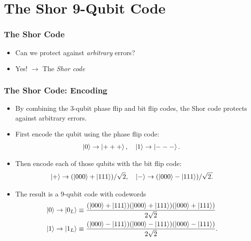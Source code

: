 \documentclass{beamer}
\begin{document}
\section{The Shor 9-Qubit Code}
\begin{frame}
    \frametitle{The Shor Code}
    \begin{itemize}
        \item<1-> Can we protect against \textit{arbitrary} errors?
        \item<2-> Yes! $\longrightarrow$ The \textit{Shor code}
    \end{itemize}
\end{frame}

\begin{frame}
    \frametitle{The Shor Code: Encoding}
    \begin{itemize}
        \item<1-> By combining the 3-qubit phase flip and bit flip codes, the Shor code protects against arbitrary errors.
        \item<2-> First encode the qubit using the phase flip code: $$\left\vert{0}\right\rangle\rightarrow\left\vert{+++}\right\rangle,\quad \left\vert{1}\right\rangle\rightarrow\left\vert{---}\right\rangle.$$
        \item<3-> Then encode each of those qubits with the bit flip code: $$\left\vert{+}\right\rangle\rightarrow (\left\vert{000}\right\rangle+\left\vert{111}\right\rangle)/\sqrt{2},\quad \left\vert{-}\right\rangle\rightarrow (\left\vert{000}\right\rangle-\left\vert{111}\right\rangle)/\sqrt{2.}$$
        \item<4-> The result is a 9-qubit code with codewords 
        \begin{align*}
            & \left\vert{0}\right\rangle \rightarrow \left\vert{0_L}\right\rangle \equiv \frac{(\left\vert{000}\right\rangle + \left\vert{111}\right\rangle)(\left\vert{000}\right\rangle + \left\vert{111}\right\rangle)(\left\vert{000}\right\rangle + \left\vert{111}\right\rangle)}{2\sqrt{2}}\\
            & \left\vert{1}\right\rangle\rightarrow \left\vert{1_L}\right\rangle \equiv \frac{(\left\vert{000}\right\rangle - \left\vert{111}\right\rangle)(\left\vert{000}\right\rangle - \left\vert{111}\right\rangle)(\left\vert{000}\right\rangle - \left\vert{111}\right\rangle)}{2\sqrt{2}}.
        \end{align*}
    \end{itemize}
\end{frame}

    
\end{document}
